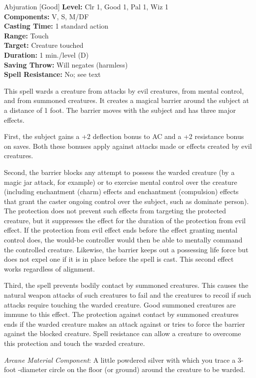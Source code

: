 {Abjuration [Good]}
{
	\textbf{Level:}
	Clr 1, Good 1, Pal 1, Wiz 1\\
	\textbf{Components:}
	V, S, M/DF\\
	\textbf{Casting Time:}
	1 standard action\\
	\textbf{Range:}
	Touch\\
	\textbf{Target:}
	Creature touched\\
	\textbf{Duration:}
	1 min./level (D)\\
	\textbf{Saving Throw:}
	Will negates (harmless)\\
	\textbf{Spell Resistance:}
	No; see text\\
}
{
	This spell wards a creature from attacks by evil creatures, from mental control, and from summoned creatures. It creates a magical barrier around the subject at a distance of 1 foot. The barrier moves with the subject and has three major effects.

	First, the subject gains a +2 deflection bonus to AC and a +2 resistance bonus on saves. Both these bonuses apply against attacks made or effects created by evil creatures.

	Second, the barrier blocks any attempt to possess the warded creature (by a magic jar attack, for example) or to exercise mental control over the creature (including enchantment (charm) effects and enchantment (compulsion) effects that grant the caster ongoing control over the subject, such as dominate person). The protection does not prevent such effects from targeting the protected creature, but it suppresses the effect for the duration of the protection from evil effect. If the protection from evil effect ends before the effect granting mental control does, the would-be controller would then be able to mentally command the controlled creature. Likewise, the barrier keeps out a possessing life force but does not expel one if it is in place before the spell is cast. This second effect works regardless of alignment.

	Third, the spell prevents bodily contact by summoned creatures. This causes the natural weapon attacks of such creatures to fail and the creatures to recoil if such attacks require touching the warded creature. Good summoned creatures are immune to this effect. The protection against contact by summoned creatures ends if the warded creature makes an attack against or tries to force the barrier against the blocked creature. Spell resistance can allow a creature to overcome this protection and touch the warded creature.

	\textit{Arcane Material Component}:
	A little powdered silver with which you trace a 3-foot -diameter circle on the floor (or ground) around the creature to be warded.

}
